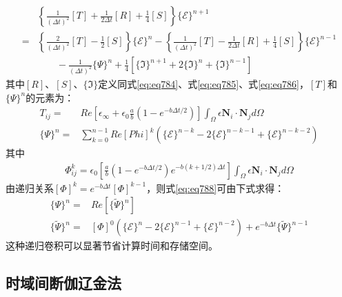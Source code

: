 \documentclass{article}
\numberwithin{equation}{section}
\begin{document}
\begin{align}
    \label{eq:eq783}
     &\left\{\frac{1}{(\Delta t)^2}[T]+\frac{1}{2\Delta t}[R]+\frac{1}{4}[S]\right\}\{\mathcal{E}\}^{n+1} \nonumber \\
    =&\left\{\frac{2}{(\Delta t)^2}[T]-\frac{1}{2}[S]\right\}\{\mathcal{E}\}^{n}-\left\{\frac{1}{(\Delta t)^2}[T]-\frac{1}{2\Delta t}[R]+\frac{1}{4}[S]\right\}\{\mathcal{E}\}^{n-1} \nonumber \\
     &\qquad-\frac{1}{(\Delta t)^2}\{\varPsi\}^n+\frac{1}{4}\left[\{\mathfrak{I}\}^{n+1}+2\{\mathfrak{I}\}^{n}+\{\mathfrak{I}\}^{n-1}\right]
\end{align}
其中$[R]$、$[S]$、$\{\mathfrak{I}\}$定义同式\ref{eq:eq784}、式\ref{eq:eq785}、式\ref{eq:eq786}，$[T]$和$\{\varPsi\}^n$的元素为：
\begin{align}
    \label{eq:787}
    T_{ij}=&Re\left[\epsilon_{\infty}+\epsilon_{0}\frac{a}{b}\left(1-e^{-b\Delta t/2}\right)\right]\int_{\Omega}\epsilon\mathbf{N}_i\cdot\mathbf{N}_jd\Omega \\
    \label{eq:eq788}
    \{\varPsi\}^n=&\sum_{k=0}^{n-1}Re[Phi]^k\left(\{\mathcal{E}\}^{n-k}-2\{\mathcal{E}\}^{n-k-1}+\{\mathcal{E}\}^{n-k-2}\right)
\end{align}
其中
\begin{align}
    \label{eq:eq789}
    \Phi^k_{ij}=\epsilon_0\left[\frac{a}{b}\left(1-e^{-b\Delta t/2}\right)e^{-b(k+1/2)\Delta t}\right]\int_{\Omega}\epsilon\mathbf{N}_i\cdot\mathbf{N}_jd\Omega
\end{align}
由递归关系$[\Phi]^k=e^{-b\Delta t}[\Phi]^{k-1}$，则式\ref{eq:eq788}可由下式求得：
\begin{align}
    \label{eq:eq790}
    \{\varPsi\}^n=&Re\left[\{\tilde{\varPsi}\}^n\right] \\
    \{\tilde{\varPsi}\}^n=&[\Phi]^0\left(\{\mathcal{E}\}^{n}-2\{\mathcal{E}\}^{n-1}+\{\mathcal{E}\}^{n-2}\right)+e^{-b\Delta t}\{\tilde{\varPsi}\}^{n-1}
\end{align}
这种递归卷积可以显著节省计算时间和存储空间。
\subsection{时域间断伽辽金法}
\end{document}
